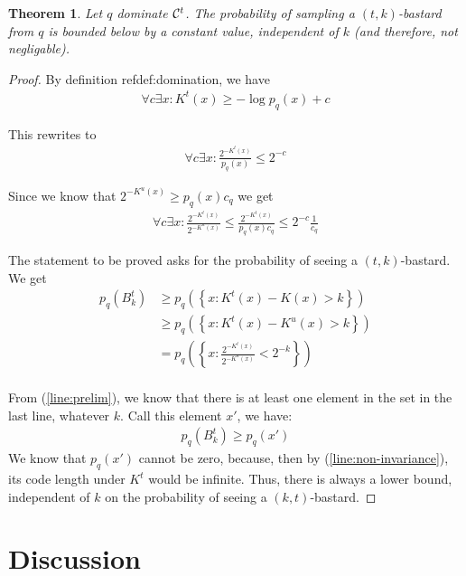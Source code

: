 \documentclass[10pt,a4paper,oneside]{article}
\newtheorem{thm}{Theorem}
\begin{document}
\begin{thm}
Let $q$ dominate ${\cal C}^t$. The probability of sampling a $(t, k)$-bastard from $q$ is bounded below by a constant value, independent of $k$ (and therefore, not negligable).
\end{thm}

\begin{proof}
By definition ref{def:domination}, we have 
\begin{align}
\forall {c \exists x : K^t(x) \geq - \log p_q(x) + c} \label{line:non-invariance}
\end{align}

This rewrites to
\begin{align*}
\forall c \exists x : \frac{2^{-K^t(x)}}{p_q(x)} \leq 2^{-c}
\end{align*}

Since we know that $2^{-K^u(x)} \geq p_q(x) c_q$ we get
\begin{align}
\forall c \exists x : \frac{2^{-K^t(x)}}{2^{-K^u(x)}} \leq \frac{2^{-K^t(x)}}{p_q(x)c_q} \leq 2^{-c}\frac{1}{c_q}
\label{line:prelim}
\end{align}

The statement to be proved asks for the probability of seeing a $(t, k)$-bastard. We get
\begin{align*}
p_q\left(B^t_k\right) &\geq p_q\left (\left\{x: K^t(x) - K(x) > k\right\}\right) \\
	&\geq p_q\left(\left\{x: K^t(x) - K^u(x) > k\right\}\right) \\
	&= p_q\left(\left\{x : \frac{2^{-K^t(x)}}{2^{-K^u(x)}} < 2^{-k}\right\}\right) \\
\end{align*}

From (\ref{line:prelim}), we know that there is at least one element in the set in the last line, whatever $k$. Call this element $x'$, we have:
\begin{align*}
p_q\left(B^t_k\right) \geq p_q\left(x'\right)
\end{align*}
We know that $p_q\left(x'\right)$ cannot be zero, because, then by (\ref{line:non-invariance}), its code length under $K^t$ would be infinite. Thus, there is always a lower bound, independent of $k$ on the probability of seeing a $(k, t)$-bastard.
\end{proof}

\section*{Discussion}

\nocite{*}


\end{document}
